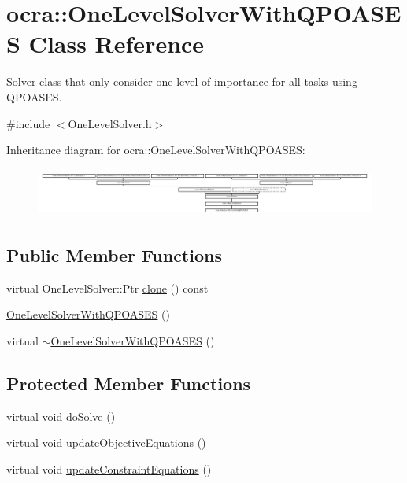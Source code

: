 \hypertarget{classocra_1_1OneLevelSolverWithQPOASES}{}\section{ocra\+:\+:One\+Level\+Solver\+With\+Q\+P\+O\+A\+S\+ES Class Reference}
\label{classocra_1_1OneLevelSolverWithQPOASES}


\hyperlink{classocra_1_1Solver}{Solver} class that only consider one level of importance for all tasks using Q\+P\+O\+A\+S\+ES.  




{\ttfamily \#include $<$One\+Level\+Solver.\+h$>$}

Inheritance diagram for ocra\+:\+:One\+Level\+Solver\+With\+Q\+P\+O\+A\+S\+ES\+:\begin{figure}[H]
\begin{center}
\leavevmode
\includegraphics[height=1.623188cm]{d0/d12/classocra_1_1OneLevelSolverWithQPOASES}
\end{center}
\end{figure}
\subsection*{Public Member Functions}
\begin{DoxyCompactItemize}
\item 
virtual One\+Level\+Solver\+::\+Ptr \hyperlink{classocra_1_1OneLevelSolverWithQPOASES_ac92f5e6885ada1f68b2f3b31cacf43f5}{clone} () const
\item 
\hyperlink{classocra_1_1OneLevelSolverWithQPOASES_a5540c732d87204ed0779b3fbaa5667b7}{One\+Level\+Solver\+With\+Q\+P\+O\+A\+S\+ES} ()
\item 
virtual \hyperlink{classocra_1_1OneLevelSolverWithQPOASES_adf42bcbdf5c169be4fe51c025ed49c53}{$\sim$\+One\+Level\+Solver\+With\+Q\+P\+O\+A\+S\+ES} ()
\end{DoxyCompactItemize}
\subsection*{Protected Member Functions}
\begin{DoxyCompactItemize}
\item 
virtual void \hyperlink{classocra_1_1OneLevelSolverWithQPOASES_aa2d1343a6e0f5c8913496c3384c0cd40}{do\+Solve} ()
\item 
virtual void \hyperlink{classocra_1_1OneLevelSolverWithQPOASES_a6a0e2cdfe22731fde09af26442a9cc85}{update\+Objective\+Equations} ()
\item 
virtual void \hyperlink{classocra_1_1OneLevelSolverWithQPOASES_abbe458ba193d545d6c07b09f582d6ce7}{update\+Constraint\+Equations} ()
\end{DoxyCompactItemize}

